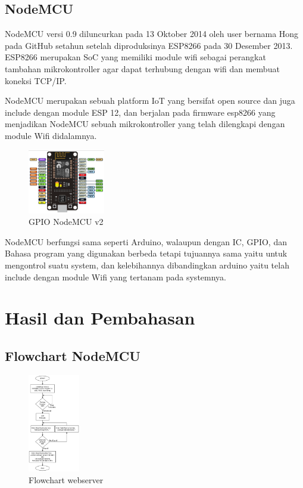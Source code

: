 \documentclass[conference]{IEEEtran}
\begin{document}
    \subsection{NodeMCU}
    NodeMCU versi 0.9 diluncurkan pada 13 Oktober 2014 oleh user bernama Hong pada GitHub setahun setelah diproduksinya ESP8266 pada 30 Desember 2013. ESP8266 merupakan SoC yang memiliki module wifi sebagai perangkat tambahan mikrokontroller agar dapat terhubung dengan wifi dan membuat koneksi TCP/IP.

    NodeMCU merupakan sebuah platform IoT yang bersifat open source dan juga include dengan module ESP 12, dan berjalan pada firmware esp8266 yang menjadikan NodeMCU sebuah mikrokontroller yang telah dilengkapi dengan module Wifi didalamnya.

    \begin{figure}[h]
        \centering
        \includegraphics[width=0.3\textwidth]{Nodem.png}
        \caption{GPIO NodeMCU v2}
    \end{figure}

    NodeMCU berfungsi sama seperti Arduino, walaupun dengan IC, GPIO, dan Bahasa program yang digunakan berbeda tetapi tujuannya sama yaitu untuk mengontrol suatu system, dan kelebihannya dibandingkan arduino yaitu telah include dengan module Wifi yang tertanam pada systemnya.

    
    
    

\section{Hasil dan Pembahasan}


\subsection{Flowchart NodeMCU}
\begin{figure}[h]
    \centering
    \includegraphics[width=0.2\textwidth]{Flowchart NodeMCU.pdf}
    \caption{Flowchart webserver}
\end{figure}
\vspace{1cm}
\end{document}
